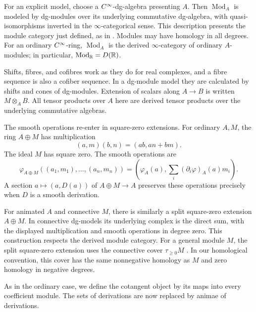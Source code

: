 For an explicit model, choose a $C^\infty$-dg-algebra presenting $A$.
Then $\operatorname{Mod}_A$ is modeled by dg-modules over its underlying
commutative dg-algebra, with quasi-isomorphisms inverted in the
$\infty$-categorical sense. This description presents the module
category just defined, as in
\citet[Corollary~4.3.1.4]{Steffens_Derived_Differential_Geometry}.
Modules may have homology in all degrees.
For an ordinary $C^\infty$-ring, $\operatorname{Mod}_A$ is the derived
$\infty$-category of ordinary $A$-modules; in particular,
$\operatorname{Mod}_{\mathbb{R}}=D(\mathbb{R})$.

Shifts, fibres, and cofibres work as they do for real complexes, and a
fibre sequence is also a cofiber sequence. In a dg-module model they
are calculated by shifts and cones of dg-modules.
Extension of scalars along $A\to B$ is written $M\otimes_A B$.
All tensor products over $A$ here are derived tensor products over
the underlying commutative algebras.

The smooth operations re-enter in square-zero extensions.
For ordinary $A,M$, the ring $A\oplus M$ has multiplication
\[
 (a,m)(b,n)=(ab,an+bm).
\]
The ideal $M$ has square zero. The smooth operations are
\begin{equation}\label{eq:Smooth_Square_Zero_Formula}
 \varphi_{A\oplus M}((a_1,m_1),\ldots,(a_n,m_n))
 =\left(\varphi_A(a),\sum_i(\partial_i\varphi)_A(a)m_i\right).
\end{equation}
A section $a\mapsto(a,D(a))$ of $A\oplus M\to A$ preserves these
operations precisely when $D$ is a smooth derivation.

For animated $A$ and connective $M$, there is similarly a split square-zero
extension $A\oplus M$. In connective dg-models its underlying complex
is the direct sum, with the displayed multiplication and smooth operations
in degree zero. This construction respects the derived module category.
For a general module $M$, the split square-zero extension uses the
connective cover $\tau_{\geq0}M$
\cite[Remark~4.3.1.5]{Steffens_Derived_Differential_Geometry}.
In our homological convention, this cover has the same nonnegative
homology as $M$ and zero homology in negative degrees.

As in the ordinary case, we define the cotangent object by its maps
into every coefficient module. The sets of derivations are now replaced
by animae of derivations.


